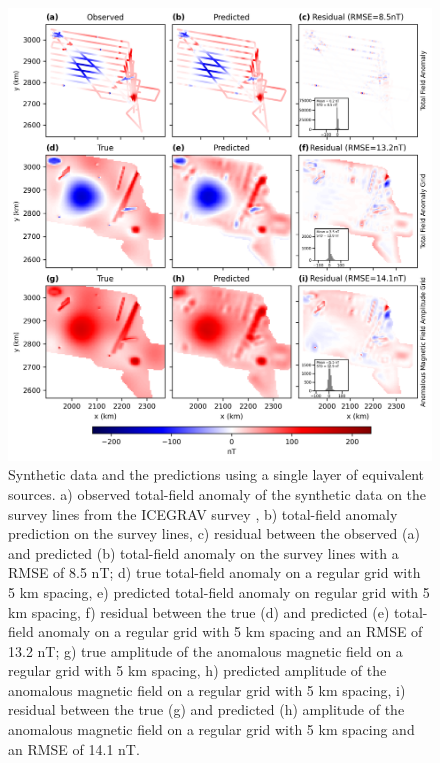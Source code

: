 \begin{figure}[tb!]
\centering
\includegraphics[width=1\linewidth]{figures/single_layer_synthetic.png}
\caption{
    Synthetic data and the predictions using a single layer of equivalent sources. a) observed total-field anomaly of the synthetic data on the survey lines from the ICEGRAV survey \citep{ICEGRAV_data}, b) total-field anomaly prediction on the survey lines, c) residual between the observed (a) and predicted (b) total-field anomaly on the survey lines with a RMSE of 8.5 nT; d) true total-field anomaly on a regular grid with 5 km spacing, e) predicted total-field anomaly on regular grid with 5 km spacing, f) residual between the true (d) and predicted (e) total-field anomaly on a regular grid with 5 km spacing and an RMSE of 13.2 nT; g) true amplitude of the anomalous magnetic field on a regular grid with 5 km spacing, h) predicted amplitude of the anomalous magnetic field on a regular grid with 5 km spacing, i) residual between the true (g) and predicted (h) amplitude of the anomalous magnetic field on a regular grid with 5 km spacing and an RMSE of 14.1 nT.
}
\label{fig:single_layer_synthetic}
\end{figure}

